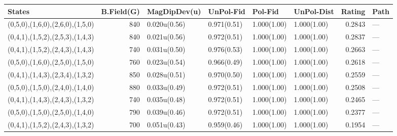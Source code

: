 \begin{tabular}{lrllllrl}
\hline
 States                          &   B.Field(G) & MagDipDev(u)   & UnPol-Fid   & Pol-Fid     & UnPol-Dist   &   Rating & Path   \\
\hline
 (0,5,0),(1,6,0),(2,6,0),(1,5,0) &          840 & 0.020u(0.56)   & 0.971(0.51) & 1.000(1.00) & 1.000(1.00)  &   0.2843 & ---    \\
 (0,4,1),(1,5,2),(2,5,3),(1,4,3) &          840 & 0.021u(0.56)   & 0.972(0.51) & 1.000(1.00) & 1.000(1.00)  &   0.2837 & ---    \\
 (0,4,1),(1,5,2),(2,4,3),(1,4,3) &          740 & 0.031u(0.50)   & 0.976(0.53) & 1.000(1.00) & 1.000(1.00)  &   0.2663 & ---    \\
 (0,5,0),(1,6,0),(2,5,0),(1,5,0) &          760 & 0.023u(0.54)   & 0.966(0.49) & 1.000(1.00) & 1.000(1.00)  &   0.2618 & ---    \\
 (0,4,1),(1,4,3),(2,3,4),(1,3,2) &          850 & 0.028u(0.51)   & 0.970(0.50) & 1.000(1.00) & 1.000(1.00)  &   0.2559 & ---    \\
 (0,5,0),(1,5,0),(2,4,0),(1,4,0) &          880 & 0.033u(0.49)   & 0.972(0.51) & 1.000(1.00) & 1.000(1.00)  &   0.2508 & ---    \\
 (0,4,1),(1,4,3),(2,4,3),(1,3,2) &          740 & 0.035u(0.48)   & 0.972(0.51) & 1.000(1.00) & 1.000(1.00)  &   0.2465 & ---    \\
 (0,5,0),(1,5,0),(2,5,0),(1,4,0) &          790 & 0.039u(0.46)   & 0.972(0.51) & 1.000(1.00) & 1.000(1.00)  &   0.2377 & ---    \\
 (0,4,1),(1,5,2),(2,4,3),(1,3,2) &          700 & 0.051u(0.43)   & 0.959(0.46) & 1.000(1.00) & 1.000(1.00)  &   0.1954 & ---    \\
\hline
\end{tabular}